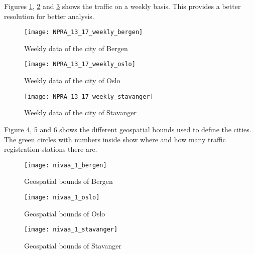 Figures \ref{fig:weeklybergen}, \ref{fig:weeklyoslo} and \ref{fig:weeklystavanger} shows the traffic on a weekly basis. This provides a better resolution for better analysis.
\begin{figure}[ht]
\texttt{[image: NPRA\_13\_17\_weekly\_bergen]}
\centering
\caption{Weekly data of the city of Bergen}
\label{fig:weeklybergen}
\end{figure}

\begin{figure}[ht]
\texttt{[image: NPRA\_13\_17\_weekly\_oslo]}
\centering
\caption{Weekly data of the city of Oslo}
\label{fig:weeklyoslo}
\end{figure}

\begin{figure}[ht]
\texttt{[image: NPRA\_13\_17\_weekly\_stavanger]}
\centering
\caption{Weekly data of the city of Stavanger}
\label{fig:weeklystavanger}
\end{figure}

Figure \ref{fig:boundsbergen}, \ref{fig:boundsoslo} and \ref{fig:boundsstavanger} shows the different geospatial bounds used to define the cities. The green circles with numbers inside show where and how many traffic registration stations there are.

\begin{figure}[ht]
\texttt{[image: nivaa\_1\_bergen]}
\centering
\caption{Geospatial bounds of Bergen}
\label{fig:boundsbergen}
\end{figure}

\begin{figure}[ht]
\texttt{[image: nivaa\_1\_oslo]}
\centering
\caption{Geospatial bounds of Oslo}
\label{fig:boundsoslo}
\end{figure}

\begin{figure}[ht]
\texttt{[image: nivaa\_1\_stavanger]}
\centering
\caption{Geospatial bounds of Stavanger}
\label{fig:boundsstavanger}
\end{figure}

\newpage\newpage

